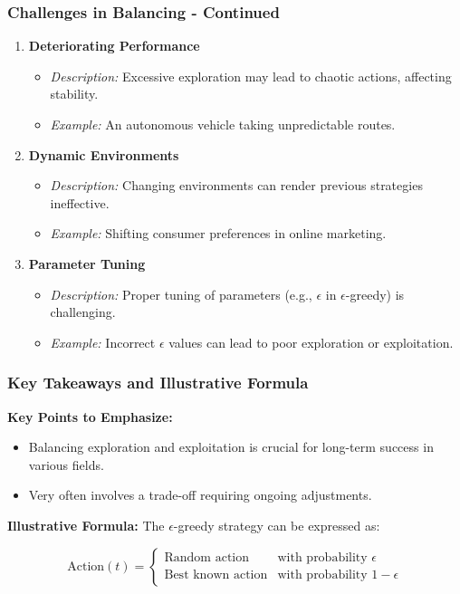 \documentclass[aspectratio=169]{beamer}
\begin{document}
\begin{frame}[fragile]
    \frametitle{Challenges in Balancing - Continued}
    
    \begin{enumerate}[resume]
        \item \textbf{Deteriorating Performance}
            \begin{itemize}
                \item \textit{Description:} Excessive exploration may lead to chaotic actions, affecting stability.
                \item \textit{Example:} An autonomous vehicle taking unpredictable routes.
            \end{itemize}
            
        \item \textbf{Dynamic Environments}
            \begin{itemize}
                \item \textit{Description:} Changing environments can render previous strategies ineffective.
                \item \textit{Example:} Shifting consumer preferences in online marketing.
            \end{itemize}
            
        \item \textbf{Parameter Tuning}
            \begin{itemize}
                \item \textit{Description:} Proper tuning of parameters (e.g., $\epsilon$ in $\epsilon$-greedy) is challenging.
                \item \textit{Example:} Incorrect $\epsilon$ values can lead to poor exploration or exploitation.
            \end{itemize}
    \end{enumerate}
\end{frame}

\begin{frame}[fragile]
    \frametitle{Key Takeaways and Illustrative Formula}
    
    \textbf{Key Points to Emphasize:}
    \begin{itemize}
        \item Balancing exploration and exploitation is crucial for long-term success in various fields.
        \item Very often involves a trade-off requiring ongoing adjustments.
    \end{itemize}
    
    \textbf{Illustrative Formula:}
    The $\epsilon$-greedy strategy can be expressed as:
    
    \begin{equation}
        \text{Action}(t) = 
        \begin{cases}
            \text{Random action} & \text{with probability } \epsilon \\
            \text{Best known action} & \text{with probability } 1 - \epsilon
        \end{cases}
    \end{equation}
\end{frame}
\end{document}
